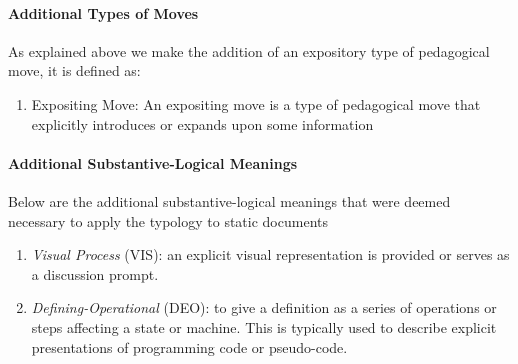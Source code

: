 \documentclass[conference]{IEEEtran}
\begin{document}
\paragraph{Additional Types of Moves}
As explained above we make the addition of an expository type of pedagogical
move, it is defined as:
\begin{enumerate}
  \item{Expositing Move:} An expositing move is a type of pedagogical move
  that explicitly introduces or expands upon some information
\end{enumerate}

\paragraph{Additional Substantive-Logical Meanings}
Below are the additional substantive-logical meanings that were deemed necessary
to apply the typology to static documents
\begin{enumerate}
  \item \emph{Visual Process} (VIS): an explicit visual representation is
    provided or serves as a discussion prompt.
  \item \emph{Defining-Operational} (DEO): to give a definition as a series
    of operations or steps affecting a state or machine. This is typically
    used to
    describe explicit presentations of programming code or pseudo-code.
\end{enumerate}
\end{document}
